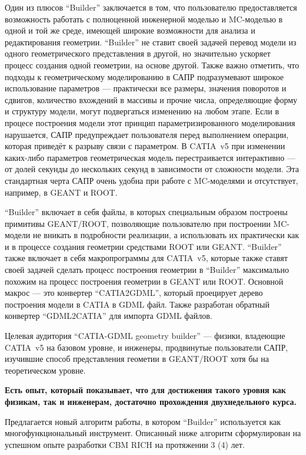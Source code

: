 Один из плюсов ``Builder'' заключается в том, что пользователю предоставляется возможность работать с полноценной инженерной моделью и MC-моделью в одной и той же среде, имеющей широкие возможности для анализа и редактирования геометрии. ``Builder'' не ставит своей задачей перевод модели из одного геометрического представления в другой, но значительно ускоряет процесс создания одной геометрии, на основе другой. Также важно отметить, что подходы к геометрическому моделированию в САПР подразумевают широкое использование параметров --- практически все размеры, значения поворотов и сдвигов, количество вхождений в массивы и прочие числа, определяющие форму и структуру модели, могут подвергаться изменению на любом этапе. Если в процесе построения модели этот принцип параметризированного моделирования нарушается, САПР предупреждает пользователя перед выполнением операции, которая приведёт к разрыву связи с параметром. В CATIA~v5 при изменении каких-либо параметров геометрическая модель перестраивается интерактивно --- от долей секунды до нескольких секунд в зависимости от сложности модели.  Эта стандартная черта САПР очень удобна при работе с MC-моделями и отсутствует, например, в GEANT и ROOT.

``Builder'' включает в себя файлы, в которых специальным образом построены примитивы GEANT/ROOT, позволяющие пользователю при построении MC-модели не вникать в подробности реализации, а использовать их практически как и в процессе создания геометрии средствами ROOT или GEANT. ``Builder'' также включает в себя макропрограммы для CATIA~v5, которые также ставят своей задачей сделать процесс построения геометрии в ``Builder'' максимально похожим на процесс построения геометрии в GEANT или ROOT. Основной макрос --- это конвертер ``CATIA2GDML'', который проецирует дерево построения модели в CATIA в GDML файл. Также разработан обратный конвертер ``GDML2CATIA'' для импорта GDML файлов.

Целевая аудитория ``CATIA-GDML geometry builder'' --- физики, владеющие CATIA~v5 на базовом уровне, и инженеры, продвинутые пользователи САПР, изучившие способ представления геометии в GEANT/ROOT хотя бы на теоретическом уровне.

\textbf{Есть опыт, который показывает, что для достижения такого уровня как физикам, так и инженерам, достаточно прохождения двухнедельного курса.}

Предлагается новый алгоритм работы, в котором ``Builder'' используется как многофункциональный инструмент. Описанный ниже алгоритм сформулирован на успешном опыте разработки CBM RICH на протяжении 3 (4) лет.

